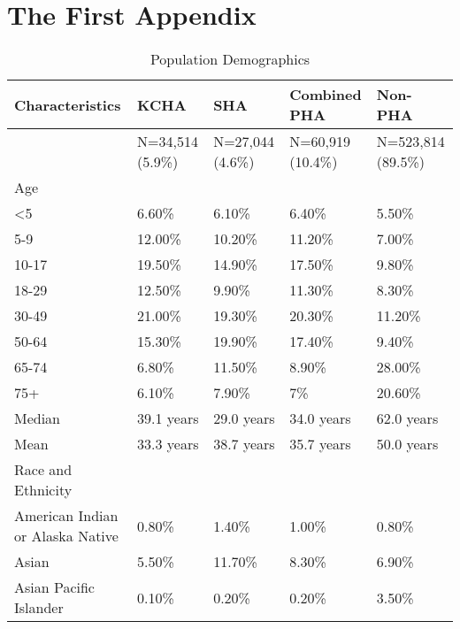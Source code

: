 \documentclass [11pt, proquest] {uwthesis}[2015/03/03]
\newenvironment{Shaded}{}{}
\newcommand{\KeywordTok}[1]{\textcolor[rgb]{0.00,0.44,0.13}{\textbf{{#1}}}}
\newcommand{\DataTypeTok}[1]{\textcolor[rgb]{0.56,0.13,0.00}{{#1}}}
\newcommand{\StringTok}[1]{\textcolor[rgb]{0.25,0.44,0.63}{{#1}}}
\newcommand{\NormalTok}[1]{{#1}}
\newcommand{\OperatorTok}[1]{\textcolor[rgb]{0.00,0.44,0.13}{\textbf{{#1}}}}
\begin{document}
\chapter{The First Appendix}\label{the-first-appendix}
\begin{Shaded}
\end{Shaded}
\begin{table}

\caption{\label{tab:unnamed-chunk-2}Population Demographics}
\centering
\begin{tabular}[t]{l|l|l|l|l}
\hline
Characteristics & KCHA & SHA & Combined PHA & Non-PHA\\
\hline
 & N=34,514 (5.9\%) & N=27,044  (4.6\%) & N=60,919  (10.4\%) & N=523,814 (89.5\%)\\
\hline
Age &  &  &  & \\
\hline
<5 & 6.60\% & 6.10\% & 6.40\% & 5.50\%\\
\hline
5-9 & 12.00\% & 10.20\% & 11.20\% & 7.00\%\\
\hline
10-17 & 19.50\% & 14.90\% & 17.50\% & 9.80\%\\
\hline
18-29 & 12.50\% & 9.90\% & 11.30\% & 8.30\%\\
\hline
30-49 & 21.00\% & 19.30\% & 20.30\% & 11.20\%\\
\hline
50-64 & 15.30\% & 19.90\% & 17.40\% & 9.40\%\\
\hline
65-74 & 6.80\% & 11.50\% & 8.90\% & 28.00\%\\
\hline
75+ & 6.10\% & 7.90\% & 7\% & 20.60\%\\
\hline
Median & 39.1 years & 29.0 years & 34.0 years & 62.0 years\\
\hline
Mean & 33.3 years & 38.7 years & 35.7 years & 50.0 years\\
\hline
Race and Ethnicity &  &  &  & \\
\hline
American Indian or Alaska Native & 0.80\% & 1.40\% & 1.00\% & 0.80\%\\
\hline
Asian & 5.50\% & 11.70\% & 8.30\% & 6.90\%\\
\hline
Asian Pacific Islander & 0.10\% & 0.20\% & 0.20\% & 3.50\%\\

\end{tabular}
\end{table}
\end{document}
